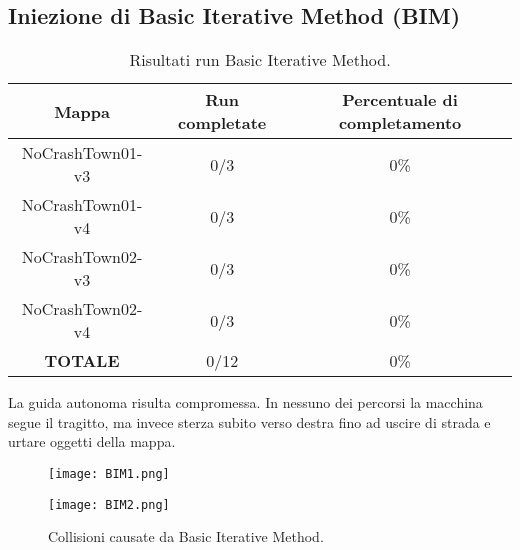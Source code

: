 \subsection{Iniezione di Basic Iterative Method (BIM)}
\begin{table}[h]
    \begin{tabular}{|c|c|c|}
        \hline
        Mappa                   & Run completate & Percentuale di completamento\\
        \hline
        NoCrashTown01-v3        & 0/3            & 0\% \\
        NoCrashTown01-v4        & 0/3            & 0\% \\
        NoCrashTown02-v3        & 0/3            & 0\% \\
        NoCrashTown02-v4        & 0/3            & 0\%  \\
        \hline
        \textbf{TOTALE}                  & 0/12           & 0\% \\
        \hline
    \end{tabular}
    \caption{Risultati run Basic Iterative Method.}
    \label{tab:bim}
\end{table}
La guida autonoma risulta compromessa. In nessuno dei percorsi la macchina segue il tragitto, ma invece sterza subito verso destra fino ad uscire di strada
e urtare oggetti della mappa.
\begin{figure}[h]
    \centering
    \parbox{5cm}{
    \texttt{[image: BIM1.png]}
    \label{fig:bim1}}
    \qquad
    \begin{minipage}{5cm}
    \texttt{[image: BIM2.png]}
    \label{fig:bim2}
    \end{minipage}
    \caption{Collisioni causate da Basic Iterative Method.}
    \label{fig:bimrun}
    \end{figure}
\newpage
